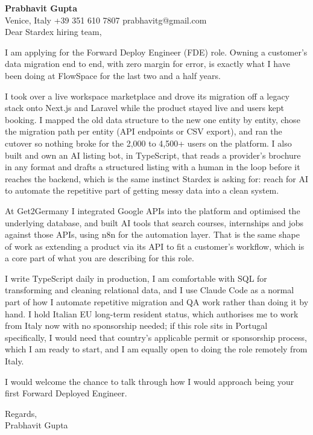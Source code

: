 \documentclass[a4paper,10.5pt]{article}
\begin{document}
\textbf{Prabhavit Gupta}\\
Venice, Italy \textbar{} +39 351 610 7807 \textbar{} prabhavitg@gmail.com\\[10pt]
Dear Stardex hiring team,

I am applying for the Forward Deploy Engineer (FDE) role. Owning a customer's data migration end to end, with zero margin for error, is exactly what I have been doing at FlowSpace for the last two and a half years.

I took over a live workspace marketplace and drove its migration off a legacy stack onto Next.js and Laravel while the product stayed live and users kept booking. I mapped the old data structure to the new one entity by entity, chose the migration path per entity (API endpoints or CSV export), and ran the cutover so nothing broke for the 2,000 to 4,500+ users on the platform. I also built and own an AI listing bot, in TypeScript, that reads a provider's brochure in any format and drafts a structured listing with a human in the loop before it reaches the backend, which is the same instinct Stardex is asking for: reach for AI to automate the repetitive part of getting messy data into a clean system.

At Get2Germany I integrated Google APIs into the platform and optimised the underlying database, and built AI tools that search courses, internships and jobs against those APIs, using n8n for the automation layer. That is the same shape of work as extending a product via its API to fit a customer's workflow, which is a core part of what you are describing for this role.

I write TypeScript daily in production, I am comfortable with SQL for transforming and cleaning relational data, and I use Claude Code as a normal part of how I automate repetitive migration and QA work rather than doing it by hand. I hold Italian EU long-term resident status, which authorises me to work from Italy now with no sponsorship needed; if this role sits in Portugal specifically, I would need that country's applicable permit or sponsorship process, which I am ready to start, and I am equally open to doing the role remotely from Italy.

I would welcome the chance to talk through how I would approach being your first Forward Deployed Engineer.

Regards,\\
Prabhavit Gupta
\end{document}
